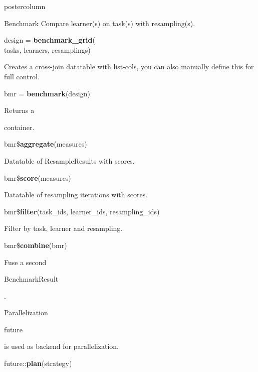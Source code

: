 \documentclass{beamer}
\newlength{\columnheight} %
\newcommand{\codeinline}[1]{\begin{codeboxinline}#1\end{codeboxinline}}
\begin{document}
\begin{withoutheader}
\begin{frame}[fragile]{}
\begin{columns}
\begin{column}{.245\textwidth}
\begin{beamercolorbox}[center]{postercolumn}
				\begin{minipage}{.98\textwidth}
					\parbox[t][\columnheight]{\textwidth}{
						\begin{myblock}{Benchmark}
                            Compare learner(s) on task(s) with resampling(s).
							\\
							\begin{codeboxmultiline}[width=19.4cm]
								design = \textbf{benchmark\_grid}(\\
								\hspace*{1ex}tasks, learners, resamplings)
							\end{codeboxmultiline}
							Creates a cross-join datatable with list-cols, you can also manually define this for full control.
							\\
							\begin{codebox}
								bmr = \textbf{benchmark}(design)
							\end{codebox}
							Returns a \codeinline{}
							container.
							\\
							\begin{codebox}
								bmr\$\textbf{aggregate}(measures)
							\end{codebox}
							Datatable of ResampleResults with scores.
							\\
							\begin{codebox}
								bmr\$\textbf{score}(measures)
							\end{codebox}
							Datatable of resampling iterations with scores. 
							\\
							\begin{codeboxmultiline}[width=26cm]
								{\footnotesize bmr\$\textbf{filter}(task\_ids, learner\_ids, resampling\_ids)}
							\end{codeboxmultiline}
							Filter by task, learner and resampling. 
							\\
							\begin{codebox}
								bmr\$\textbf{combine}(bmr)
							\end{codebox}
							Fuse a second \codeinline{BenchmarkResult}. 
						\end{myblock}
						\begin{myblock}{Parallelization}
							\codeinline{future} is used as backend for parallelization.
							\\
							\begin{codebox}
								future::\textbf{plan}(strategy)
							\end{codebox}

\end{myblock}}
\end{minipage}
\end{beamercolorbox}
\end{column}
\end{columns}
\end{frame}
\end{withoutheader}
\end{document}
